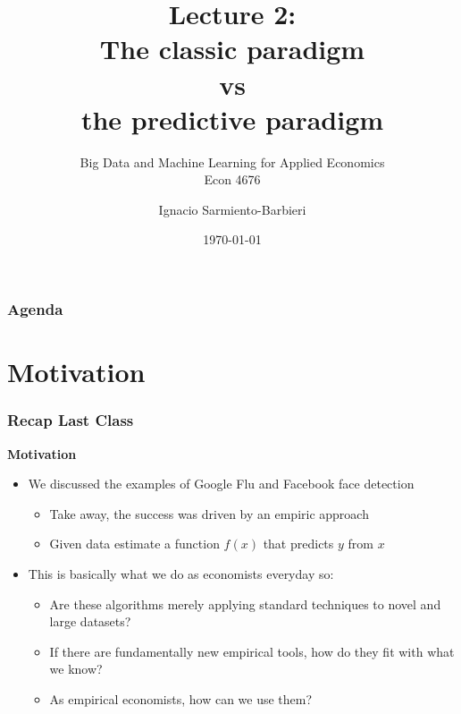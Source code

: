 \documentclass[
  shownotes,
  xcolor={svgnames},
  hyperref={colorlinks,citecolor=DarkBlue,linkcolor=DarkRed,urlcolor=DarkBlue}
  ]{beamer}
\begin{document}
\title[Lecture 2]{Lecture 2: \\ The classic paradigm \\ vs \\ the predictive paradigm}
\subtitle{Big Data and Machine Learning for Applied Economics \\ Econ 4676}
\date{\today}

\author[Sarmiento-Barbieri]{Ignacio Sarmiento-Barbieri}


\begin{frame}[noframenumbering]
\maketitle
\end{frame}





\begin{frame}
\frametitle{Agenda}

\tableofcontents


\end{frame}




\section{Motivation}
\begin{frame}
\frametitle{Recap Last Class}


{\bf Motivation}

\bigskip

\begin{itemize}
      \item We discussed the examples of Google Flu and Facebook face detection
      \medskip
      \begin{itemize}
        \item Take away, the success was driven by an empiric approach
        \item Given data  estimate a function $f(x)$ that predicts $y$ from $x$
      \end{itemize}
      \medskip

      \item  This is basically what we do as economists everyday so:
      \begin{itemize}
        \item  Are these algorithms merely applying standard techniques to novel and large datasets?
        \item  If there are fundamentally new empirical tools, how do they fit with what we know?
        \item  As empirical economists, how can we use them?
       \end{itemize}
\end{itemize}

\end{frame}
\end{document}
